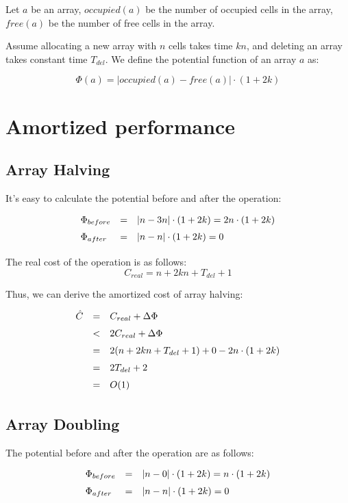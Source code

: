 Let $a$ be an array, $occupied(a)$ be the number of occupied cells in the array, $free(a)$ be the number of free cells in the array.

Assume allocating a new array with $n$ cells takes time $kn$, and deleting an array takes constant time $T_{del}$. We define the potential function of an array $a$ as:

\begin{equation}
\Phi(a) = | occupied(a) - free(a) | \cdot (1 + 2k)
\end{equation}

\section{Amortized performance}

  \subsection{Array Halving}
  It's easy to calculate the potential before and after the operation:
  \[
  \def\arraystretch{1.5}
  \begin{array}{lcl}
    \Phi_{before} & = & | n - 3n | \cdot (1 + 2k) = 2n \cdot (1 + 2k) \\
    \Phi_{after} & = & | n - n | \cdot (1 + 2k) = 0
  \end{array}
  \]


  The real cost of the operation is as follows:
  \[
  C_{real} = n + 2kn + T_{del} + 1
  \]


  Thus, we can derive the amortized cost of array halving:
  \[
  \def\arraystretch{1.5}
  \begin{array}{lcl}
  \hat C & = & C_{real} + \Delta \Phi \\
         & < & 2 C_{real} + \Delta \Phi \\
         & = & 2(n + 2kn + T_{del} + 1) + 0 - 2n \cdot (1 + 2k) \\
         & = & 2T_{del} + 2 \\
         & = & O(1)
  \end{array}
  \]

  \subsection{Array Doubling}
  The potential before and after the operation are as follows:
  \[
  \def\arraystretch{1.5}
  \begin{array}{lcl}
    \Phi_{before} & = & | n - 0 | \cdot (1 + 2k) = n \cdot (1 + 2k) \\
    \Phi_{after} & = & | n - n | \cdot (1 + 2k) = 0
  \end{array}
  \]

